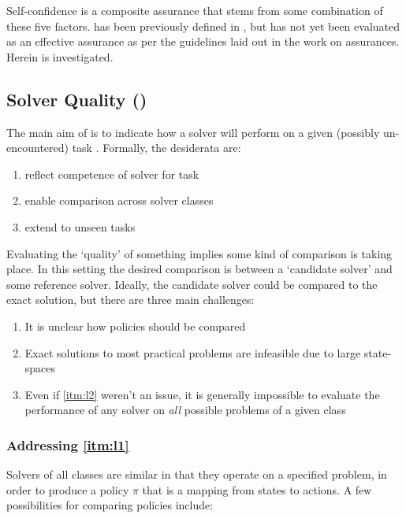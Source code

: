     Self-confidence \xSC{} is a composite assurance that stems from some combination of these five factors. \xP{} has been previously defined in \cite{Aitken2016-cv}, but has not yet been evaluated as an effective assurance as per the guidelines laid out in the work on assurances. Herein \xQ{} is investigated.

\subsection{Solver Quality (\xQ)} \label{sec:SQ}
    The main aim of \xQ{} is to indicate how a solver \solve{} will perform on a given (possibly un-encountered) task \task{}. Formally, the desiderata are:

    \begin{enumerate}[label=\textbf{D\arabic*}]
        \item reflect competence of solver \solve{} for task \task{} \label{itm:d1}
        \item enable comparison across solver classes \label{itm:d2}
        \item extend to unseen tasks \label{itm:d3}
    \end{enumerate}
    
    Evaluating the `quality' of something implies some kind of comparison is taking place. In this setting the desired comparison is between a `candidate solver' \solve{} and some reference solver. Ideally, the candidate solver could be compared to the exact solution, but there are three main challenges:

    \begin{enumerate}[label=\textbf{C\arabic*}]
        \item It is unclear how policies should be compared \label{itm:l1}
        \item Exact solutions to most practical problems are infeasible due to large state-spaces \label{itm:l2}
        \item Even if \ref{itm:l2} weren't an issue, it is generally impossible to evaluate the performance of any solver on \emph{all} possible problems \label{itm:l3} of a given class
    \end{enumerate}

    \subsubsection{Addressing \ref{itm:l1}} \label{sec:compare_policies}
        Solvers of all classes are similar in that they operate on a specified problem, in order to produce a policy $\pi$ that is a mapping from states to actions. A few possibilities for comparing policies include:
    
